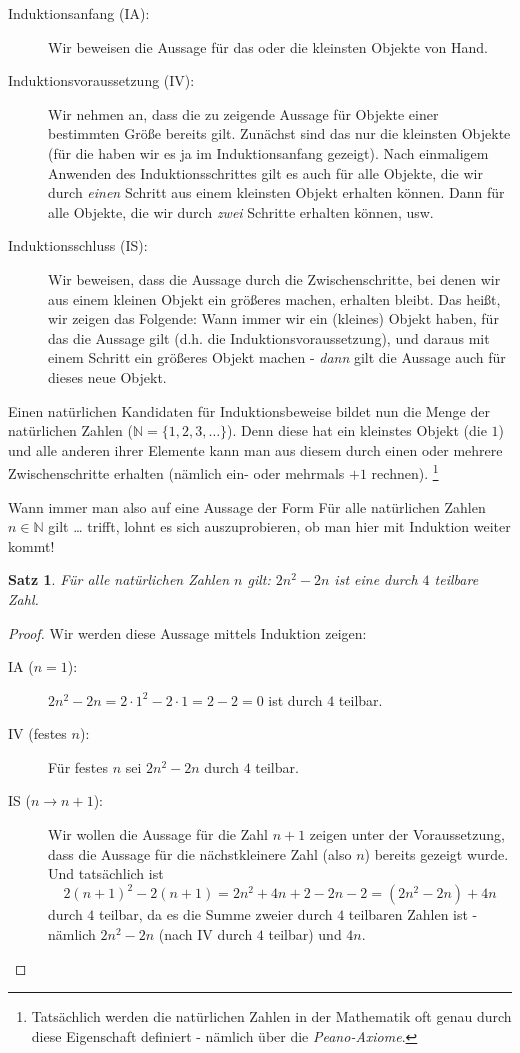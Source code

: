 \documentclass[a4paper,ngerman,12pt]{scrartcl}
\newcommand{\NN}{\mathbb{N}}
\theoremstyle{definition}
\theoremstyle{plain}
\newtheorem{satz}[defn]{Satz}
\theoremstyle{remark}
\begin{document}
\begin{description}
	\item[Induktionsanfang (IA):] Wir beweisen die Aussage für das oder die kleinsten Objekte von Hand.
	\item[Induktionsvoraussetzung (IV):] Wir nehmen an, dass die zu zeigende Aussage für Objekte einer bestimmten Größe bereits gilt. Zunächst sind das nur die kleinsten Objekte (für die haben wir es ja im Induktionsanfang gezeigt). Nach einmaligem Anwenden des Induktionsschrittes gilt es auch für alle Objekte, die wir durch \emph{einen} Schritt aus einem kleinsten Objekt erhalten können. Dann für alle Objekte, die wir durch \emph{zwei} Schritte erhalten können, usw.
	\item[Induktionsschluss (IS):] Wir beweisen, dass die Aussage durch die Zwischenschritte, bei denen wir aus einem kleinen Objekt ein größeres machen, erhalten bleibt. Das heißt, wir zeigen das Folgende: Wann immer wir ein (kleines) Objekt haben, für das die Aussage gilt (d.h. die Induktionsvoraussetzung), und daraus mit einem Schritt ein größeres Objekt machen - \emph{dann} gilt die Aussage auch für dieses neue Objekt.
\end{description}


Einen natürlichen Kandidaten für Induktionsbeweise bildet nun die Menge der natürlichen Zahlen ($\mathbb{N} = \{1,2,3, \dots\}$). Denn diese hat ein kleinstes Objekt (die $1$) und alle anderen ihrer Elemente kann man aus diesem durch einen oder mehrere Zwischenschritte erhalten (nämlich ein- oder mehrmals $+1$ rechnen).
\footnote{Tatsächlich werden die natürlichen Zahlen in der Mathematik oft genau durch diese Eigenschaft definiert - nämlich über die \emph{Peano-Axiome}.}

Wann immer man also auf eine Aussage der Form \glqq Für alle natürlichen Zahlen $n \in \NN$ gilt \dots\grqq{} trifft, lohnt es sich auszuprobieren, ob man hier mit Induktion weiter kommt!

\begin{satz}\label{satz:zentrierteViereckszahl}
	Für alle natürlichen Zahlen $n$ gilt: $2n^2-2n$ ist eine durch $4$ teilbare Zahl.
\end{satz}

\begin{proof}
	Wir werden diese Aussage mittels Induktion zeigen:
	\begin{description}
		\item[IA ($n=1$):] $2n^2-2n  = 2\cdot 1^2 -2 \cdot 1 = 2-2 = 0$ ist durch $4$ teilbar.
		\item[IV (festes $n$):] Für festes $n$ sei $2n^2-2n$ durch $4$ teilbar.
		\item[IS ($n \to n+1$):] Wir wollen die Aussage für die Zahl $n+1$ zeigen unter der Voraussetzung, dass die Aussage für die nächstkleinere Zahl (also $n$) bereits gezeigt wurde. Und tatsächlich ist
		\[2(n+1)^2-2(n+1)  = 2n^2+4n+2-2n-2 = (2n^2-2n) + 4n\]
		durch $4$ teilbar, da es die Summe zweier durch $4$ teilbaren Zahlen ist - nämlich  $2n^2-2n$ (nach IV durch $4$ teilbar) und $4n$. \qedhere
	\end{description}
\end{proof}
\end{document}
